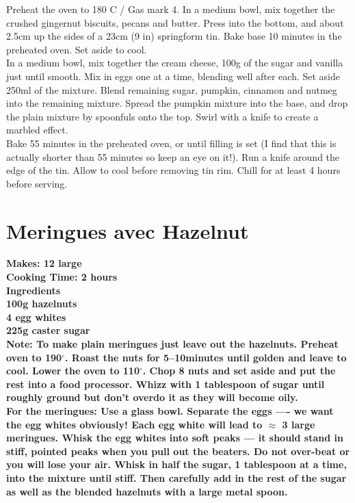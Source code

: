 \documentclass[18pt, oneside]{book}
\begin{document}
Preheat the oven to 180 C / Gas mark 4. In a medium bowl, mix together the crushed gingernut biscuits, pecans and butter. Press into the bottom, and about 2.5cm up the sides of a 23cm (9 in) springform tin. Bake base 10 minutes in the preheated oven. Set aside to cool. \\

In a medium bowl, mix together the cream cheese, 100g of the sugar and vanilla just until smooth. Mix in eggs one at a time, blending well after each. Set aside 250ml of the mixture. Blend remaining sugar, pumpkin, cinnamon and nutmeg into the remaining mixture.
Spread the pumpkin mixture into the base, and drop the plain mixture by spoonfuls onto the top. Swirl with a knife to create a marbled effect. \\

Bake 55 minutes in the preheated oven, or until filling is set (I find that this is actually shorter than 55 minutes so keep an eye on it!). Run a knife around the edge of the tin. Allow to cool before removing tin rim. Chill for at least 4 hours before serving.

\section{Meringues avec Hazelnut}
\bf{Makes: 12 large} \\
\bf{Cooking Time: 2 hours} \\

\bf{Ingredients} \normalfont \\ 
100g hazelnuts \\
4 egg whites \\
225g caster sugar \\


Note: To make plain meringues just leave out the hazelnuts. Preheat oven to 190$^{\circ}$. Roast the nuts for 5--10minutes until golden and leave to cool. Lower the oven to 110$^{\circ}$. Chop 8 nuts and set aside and put the rest into a food processor. Whizz with 1 tablespoon of sugar until roughly ground but don't overdo it as they will become oily. \\

For the meringues: Use a glass bowl. Separate the eggs ---- we want the egg whites obviously! Each egg white will lead to $\approx$ 3 large meringues. Whisk the egg whites into soft peaks --- it should stand in stiff, pointed peaks when you pull out the beaters. Do not over-beat or you will lose your air. Whisk in half the sugar, 1 tablespoon at a time, into the mixture until stiff. Then carefully add in the rest of the sugar as well as the blended hazelnuts with a large metal spoon. \\
\end{document}

